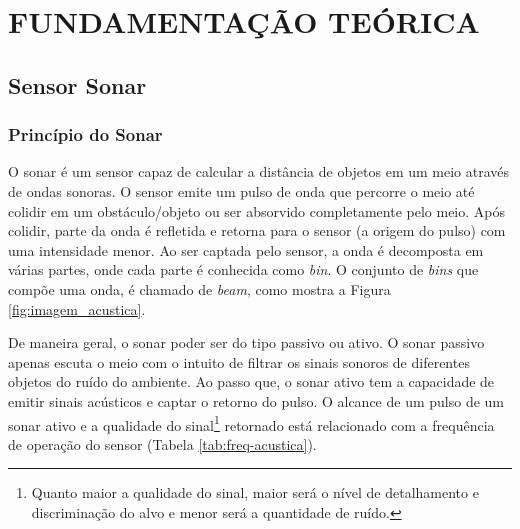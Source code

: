 \chapter{FUNDAMENTAÇÃO TEÓRICA}
\label{chap:fundamentacaoTeorica}


\section{Sensor Sonar}
\label{sec:sonar}

\subsection{Princípio do Sonar}
\label{sec:principio-sonar}

O sonar é um sensor capaz de calcular a distância de objetos em um meio através de ondas sonoras. O sensor emite um pulso de onda que percorre o meio até colidir em um obstáculo/objeto ou ser absorvido completamente pelo meio. Após colidir, parte da onda é refletida e retorna para o sensor (a origem do pulso) com uma intensidade menor. Ao ser captada pelo sensor, a onda é decomposta em várias partes, onde cada parte é conhecida como \textit{bin}. O conjunto de \textit{bins} que compõe uma onda, é chamado de \textit{beam}, como mostra a Figura \ref{fig:imagem_acustica}.

De maneira geral, o sonar poder ser do tipo passivo ou ativo. O sonar passivo apenas escuta o meio com o intuito de filtrar os sinais sonoros de diferentes objetos do ruído do ambiente. Ao passo que, o sonar ativo tem a capacidade de emitir sinais acústicos e captar o retorno do pulso. O alcance de um pulso de um sonar ativo e a qualidade do sinal\footnote{Quanto maior a qualidade do sinal, maior será o nível de detalhamento e discriminação do alvo e menor será a quantidade de ruído.} retornado está relacionado com a frequência de operação do sensor (Tabela \ref{tab:freq-acustica}).

